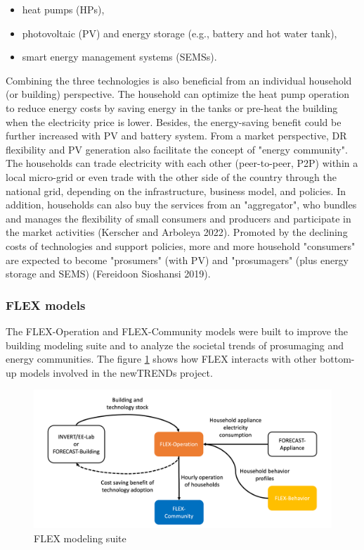 \begin{itemize}
  \item heat pumps (HPs),
  \item photovoltaic (PV) and energy storage (e.g., battery and hot water tank),
  \item smart energy management systems (SEMSs).
\end{itemize}

Combining the three technologies is also beneficial from an individual household (or building) perspective. The household can optimize the heat pump operation to reduce energy costs by saving energy in the tanks or pre-heat the building when the electricity price is lower. Besides, the energy-saving benefit could be further increased with PV and battery system.
From a market perspective, DR flexibility and PV generation also facilitate the concept of "energy community". The households can trade electricity with each other (peer-to-peer, P2P) within a local micro-grid or even trade with the other side of the country through the national grid, depending on the infrastructure, business model, and policies. In addition, households can also buy the services from an "aggregator", who bundles and manages the flexibility of small consumers and producers and participate in the market activities (Kerscher and Arboleya 2022). 
Promoted by the declining costs of technologies and support policies, more and more household "consumers" are expected to become "prosumers" (with PV) and "prosumagers" (plus energy storage and SEMS) (Fereidoon Sioshansi 2019).


\subsubsection{FLEX models}

The FLEX-Operation and FLEX-Community models were built to improve the building modeling suite and to analyze the societal trends of prosumaging and energy communities.
The figure \ref{fig:flex} shows how FLEX interacts with other bottom-up models involved in the newTRENDs project.

\begin{figure}[h]
  \centering
  \includegraphics[width=\textwidth]{Images/flex.png}
  \caption{FLEX modeling suite}
  \label{fig:flex}
\end{figure}

